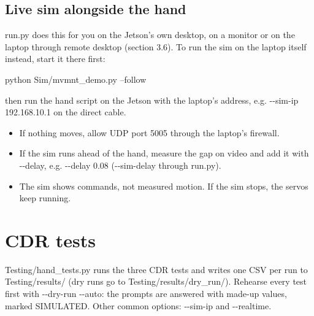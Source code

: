 \documentclass[11pt,letterpaper]{article}
\newcommand{\code}[1]{\textcolor{codeblue}{\ttfamily\smaller\relax #1}}
\begin{document}
\subsection{Live sim alongside the hand}
\code{run.py} does this for you on the Jetson's own desktop, on a monitor or on the laptop through remote desktop (section 3.6). To run the sim on the laptop itself instead, start it there first:

\begin{codeblock}
python Sim/mvmnt_demo.py --follow
\end{codeblock}
then run the hand script on the Jetson with the laptop's address, e.g. \code{-{}-{}sim-{}\allowbreak{}ip 192.168.10.1} on the direct cable.

\begin{itemize}
  \item If nothing moves, allow UDP port 5005 through the laptop's firewall.
  \item If the sim runs ahead of the hand, measure the gap on video and add it with \code{-{}-{}delay}, e.g. \code{-{}-{}delay 0.08} (\code{-{}-{}sim-{}\allowbreak{}delay} through \code{run.py}).
  \item The sim shows commands, not measured motion. If the sim stops, the servos keep running.
\end{itemize}


\section{CDR tests}
\code{Testing/\allowbreak{}hand\_\allowbreak{}tests.py} runs the three CDR tests and writes one CSV per run to \code{Testing/\allowbreak{}results/\allowbreak{}} (dry runs go to \code{Testing/\allowbreak{}results/\allowbreak{}dry\_\allowbreak{}run/\allowbreak{}}). Rehearse every test first with \code{-{}-{}dry-{}\allowbreak{}run -{}-{}auto}: the prompts are answered with made-up values, marked SIMULATED. Other common options: \code{-{}-{}sim-{}\allowbreak{}ip} and \code{-{}-{}realtime}.
\end{document}
